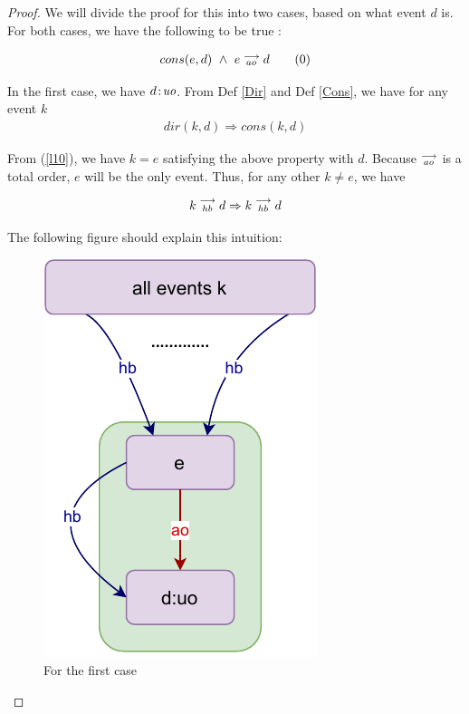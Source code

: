 \begin{proof}
    
    We will divide the proof for this into two cases, based on what event $d$ is. For both cases, we have the following to be true :
    
    \begin{align*}
        cons(e,d) \ \wedge \ e\stackrel{\longrightarrow}{_{ao}}d
        \tag{0}
        \label{l10}
    \end{align*}
        
    In the first case, we have $d\!:\!\textit{uo}$. From Def \ref{Dir} and Def \ref{Cons}, we have for any event $k$
    \begin{align*}
        dir(k,d) \Rightarrow cons(k,d)
    \end{align*}
        
    From (\ref{l10}), we have $k=e$ satisfying the above property with $d$. 
    Because $\stackrel{\longrightarrow}{_{ao}}$ is a total order, $e$ will be the only event. Thus, for any other $k \neq e$, we have 
    
    \begin{align*}
        k\stackrel{\longrightarrow}{_{hb}}d \Rightarrow k\stackrel{\longrightarrow}{_{hb}}d
    \end{align*}
    
    The following figure should explain this intuition:  
    \begin{figure}[H]
        \centering
        \includegraphics[scale=0.7]{InstructionReordering/Lemmas/lemma_proof1_case1.pdf}
        \caption{For the first case}
        \label{fig:my_label}
    \end{figure}
    

\end{proof}
